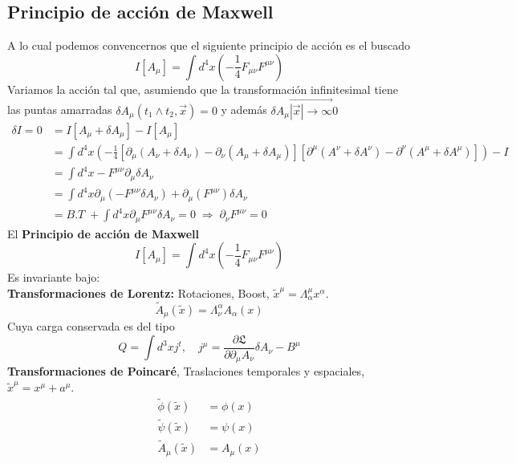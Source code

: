 \documentclass[../main.tex]{subfiles}
\begin{document}
\subsection{Principio de acción de Maxwell}
A lo cual podemos convencernos que el siguiente principio de acción es el buscado
\begin{equation}
  I[A_\mu ] = \int d^4x \left( -\frac{1}{4}F_{\mu \nu} F^{\mu \nu} \right)
 \end{equation}
 Variamos la acción tal que, asumiendo  que la transformación infinitesimal tiene las puntas amarradas $\delta A_\mu(t_1 \wedge t_2,\vec{x}) = 0$ y además $\delta A_\mu \stackrel{\longrightarrow}{|\vec{x}|\to \infty} 0 $ 
 \begin{align*}
   \delta I = 0  &= I[A_\mu + \delta A_\mu] - I[A_\mu] \\
   & =  \int d^4x \left( -\frac{1}{4}\left[ \partial_\mu \left( A_\nu + \delta A_\nu \right) -\partial_\nu \left( A_\mu + \delta A_\mu  \right) \right] \left[ \partial^\mu \left( A^\nu + \delta A^\nu  \right)  - \partial^\nu \left( A^\mu + \delta A^\mu \right)\right] \right) - I \\
   & = \int d^4x - F^{\mu \nu} \partial_\mu \delta A_\nu \\
   & = \int d^4x \partial_\mu \left( -F^{\mu \nu} \delta A_\nu \right) + \partial_\mu \left( F^{\mu \nu} \right)\delta A_\nu \\
   & = B.T \; + \int d^4x \partial_\mu F^{\mu\nu} \delta A_\nu = 0 \; \Rightarrow \; \partial_\nu F^{\mu \nu} = 0
 \end{align*}
El \textbf{Principio de acción de Maxwell}
\begin{equation}
  I[A_\mu]  = \int d^4x \left( -\frac{1}{4}F_{\mu \nu} F^{\mu \nu} \right)
 \end{equation}
 Es invariante bajo: \\
 \textbf{Transformaciones de Lorentz:} Rotaciones, Boost, $\tilde{x}^\mu = \Lambda^\mu_\alpha x^\alpha$.
 \begin{equation*}
   \tilde{{A}}_\mu(\tilde{x}) = \Lambda^\alpha_\nu A_\alpha(x) 
 \end{equation*}
 Cuya carga conservada es del tipo
 \begin{equation*}
   Q = \int d^3x j^t, \quad j^\mu = \frac{\partial \mathfrak{L}}{\partial \partial_\mu A_\nu}\delta A_\nu - B^\mu
 \end{equation*}
\textbf{Transformaciones de Poincaré}, Traslaciones temporales y espaciales, $\tilde{x}^\mu = x^\mu + a^\mu$. 
\begin{align*}
  \tilde{\phi}(\tilde{x}) & = \phi(x) \\
  \tilde{\psi}(\tilde{x}) & = \psi(x) \\
  \tilde{{A}}_\mu(\tilde{x}) & = A_\mu(x)
\end{align*}
\end{document}
